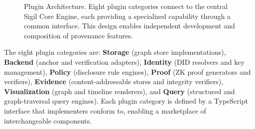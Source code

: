 \documentclass[conference]{IEEEtran}
\begin{document}
\begin{figure}[t]
\centering
\caption{Plugin Architecture. Eight plugin categories connect to the central
  Sigil Core Engine, each providing a specialized capability through a common
  interface.  This design enables independent development and composition of
  provenance features.}
\label{fig:plugins}
\end{figure}

The eight plugin categories are: \textbf{Storage} (graph store
implementations), \textbf{Backend} (anchor and verification adapters),
\textbf{Identity} (DID resolvers and key management), \textbf{Policy}
(disclosure rule engines), \textbf{Proof} (ZK proof generators and
verifiers), \textbf{Evidence} (content-addressable stores and integrity
verifiers), \textbf{Visualization} (graph and timeline renderers), and
\textbf{Query} (structured and graph-traversal query engines).  Each plugin
category is defined by a TypeScript interface that implementers conform to,
enabling a marketplace of interchangeable components.
\end{document}
